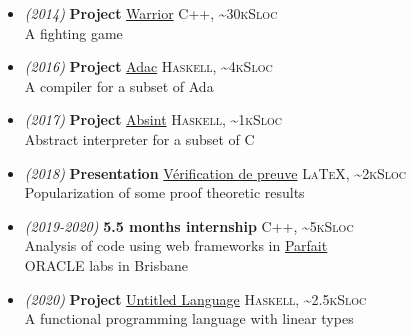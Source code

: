 \documentclass[a4paper,11pt]{extarticle}
\newcommand{\lang}[2]{\hfill \textsc{\scriptsize #1, \textasciitilde#2Sloc}}
\begin{document}
\begin{minipage}[c][282mm][t]{0.60\linewidth}
{        \begin{itemize}
          \item \emph{\small (2014)} \textbf{Project} \href{https://github.com/DWARVES/Project-Warrior}{Warrior}
                \lang{C++}{30k}\\
                A fighting game
          \item \emph{\small (2016)} \textbf{Project} \href{https://github.com/TWal/ENS\_Adac}{Adac}
                \lang{Haskell}{4k}\\
                A compiler for a subset of Ada
          \item \emph{\small (2017)} \textbf{Project} \href{https://github.com/dwarfmaster/absint}{Absint}
                \lang{Haskell}{1k}\\
                Abstract interpreter for a subset of C
          \item \emph{\small (2018)} \textbf{Presentation} \href{https://sapt.fr/exposes/verification-automatique-de-preuves-884}{Vérification de preuve}
                \lang{\LaTeX}{2k}\\
                Popularization of some proof theoretic results
          \item \emph{\small (2019-2020)} \textbf{5.5 months internship}
                \lang{C++}{5k}\\
                Analysis of code using web frameworks in \href{https://labs.oracle.com/pls/apex/f?p=LABS:project_details:0:13}{Parfait}\\
                ORACLE labs in Brisbane
          \item \emph{\small (2020)} \textbf{Project} \href{https://github.com/math-fehr/Untitled-Language}{Untitled Language}
                \lang{Haskell}{2.5k}\\
                A functional programming language with linear types
        \end{itemize}

      }
    \end{minipage}
\end{document}
